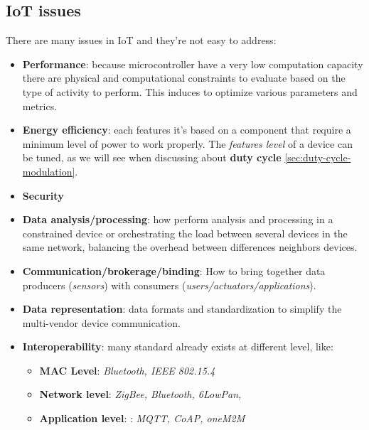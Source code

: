 \documentclass[10pt,a4paper]{report}
\theoremstyle{definition}
\begin{document}
\subsection{IoT issues}
There are many issues in IoT and they're not easy to address:
\begin{itemize}
	\item 
	\textbf{Performance}: because microcontroller have a very low computation capacity there are physical and computational constraints to evaluate based on the type of activity to perform. This induces to optimize various parameters and metrics.
	\item 
	\textbf{Energy efficiency}: each features it's based on a component that require a minimum level of power to work properly. The \textit{features level} of a device can be tuned, as we will see when discussing about \textbf{duty cycle} \ref{sec:duty-cycle-modulation}. 
	\item 
	\textbf{Security}
	\item 
	\textbf{Data analysis/processing}: how perform analysis and processing in a constrained device or orchestrating the load between several devices in the same network, balancing the overhead between differences neighbors devices.
	\item 
	\textbf{Communication/brokerage/binding}: How to bring together data producers (\textit{sensors}) with consumers (\textit{users/actuators/applications}).
	\item 
	\textbf{Data representation}: data formats and standardization to simplify the multi-vendor device communication.
	\item 
	\textbf{Interoperability}: many standard already exists at different level, like:
	\begin{itemize}
		\item 
		\textbf{MAC Level}: \textit{Bluetooth, IEEE 802.15.4}
		\item 
		\textbf{Network level}: \textit{ZigBee, Bluetooth, 6LowPan,}
		\item 
		\textbf{Application level}: : \textit{MQTT, CoAP, oneM2M}
	\end{itemize}
\end{itemize}
\end{document}
